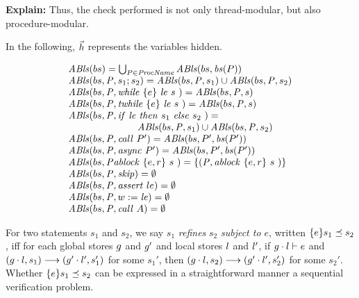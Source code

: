 
{\bf Explain:} Thus, the check performed is not only thread-modular, but also procedure-modular. 

In the following, $\vec{h}$ represents the variables hidden.

$$
\begin{array}{l}
\mathit{ABls}(bs)   =   \bigcup_{P \in \mathit{ProcName}} \mathit{ABls}(bs, \mathit{bs}(P)) \\
\mathit{ABls}(bs, \mathit{P}, s_1; s_2)   =  \mathit{ABls}(bs, \mathit{P}, s_1) \cup 
                                                                                         \mathit{ABls}(bs, \mathit{P}, s_2) \\
 \mathit{ABls}(bs, \mathit{P}, \mathit{while}\ \{{e}\}\ {{\mathit{le}}\ } {{s}\ } )   =   \mathit{ABls}(bs,\mathit{P},  s) \\
\mathit{ABls}(bs, \mathit{P}, \mathit{twhile}\ \{{e}\}\ {{\mathit{le}}\ } {{s}\ } )   =   \mathit{ABls}(bs, \mathit{P},  s) \\
\mathit{ABls}(bs, \mathit{P}, {\mathit{if}\ {\mathit{le}}\ }{\mathit{then}\ {s_1}\ }{\mathit{else}\ {s_2}\ })   =   \\
\hspace*{2.5cm} \mathit{ABls}(bs, \mathit{P}, s_1) \cup \mathit{ABls}(bs, \mathit{P}, s_2) \\
\mathit{ABls}(bs, \mathit{P}, \mathit{call}\ P')   =   \mathit{ABls}(bs, P', \mathit{bs}(P') ) \\ 
\mathit{ABls}(bs, \mathit{P}, \mathit{async}\ P')   =   \mathit{ABls}(bs, P', \mathit{bs}(P') ) \\ 
\mathit{ABls}(bs, \mathit{P} \mathit{ablock}\ {\{e,r\}}\ {s}\ )   =   \{(\mathit{P}, \mathit{ablock}\ {\{e,r\}}\ {s}\ ) \} \\ 
\mathit{ABls}(bs, \mathit{P}, \mathit{skip})   =   \emptyset \\
\mathit{ABls}(bs, \mathit{P}, \mathit{assert}\ le)  =   \emptyset \\
\mathit{ABls}(bs, \mathit{P}, w := \mathit{le})   =   \emptyset \\
\mathit{ABls}(bs, \mathit{P}, \mathit{call}\ A)   =   \emptyset \\
\end{array}
$$

For two statements $s_1$ and $s_2$, we say $s_1$ {\em refines} $s_2$
{\em subject to $e$}, written $\{ {e} \} {s_1} \preceq {s_2}$, iff for each global
stores $g$ and $g'$ and local stores $l$ and $l'$,
if $g \cdot l \vdash e$ and $(g \cdot l, s_1)
\longrightarrow (g' \cdot l', s_1')$ for some $s_1'$, then $(g \cdot l, s_2)
\longrightarrow (g' \cdot l', s_2')$ for some $s_2'$. Whether $\{ {e} \} {s_1} \preceq {s_2}$ can be
expressed in a straightforward manner a sequential verification
problem.

